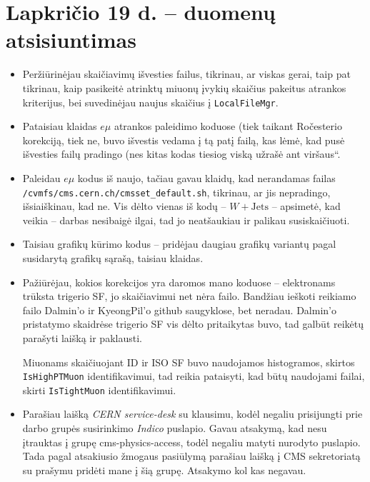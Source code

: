 \documentclass[a4paper, 12pt]{article}
\newcommand{\WJets}{W\! +\!\mathrm{Jets}}
\newcommand{\emu}{e\mu}
\newcommand{\ltq}[1]{{\quotedblbase{}#1\textquotedblleft{}}}
\newcommand{\ttt}[1]{\texttt{#1}}
\begin{document}
\section{Lapkričio 19 d. -- duomenų atsisiuntimas}
\begin{itemize}
	\item Peržiūrinėjau skaičiavimų išvesties failus, tikrinau, ar viskas gerai, taip pat tikrinau,
	kaip pasikeitė atrinktų miuonų įvykių skaičius pakeitus atrankos kriterijus, bei suvedinėjau
	naujus skaičius į \ttt{LocalFileMgr}.
	\item Pataisiau klaidas $\emu$ atrankos paleidimo koduose (tiek taikant Ročesterio korekciją, tiek ne,
	buvo išvestis vedama į tą patį failą, kas lėmė, kad pusė išvesties failų pradingo (nes kitas kodas
	tiesiog viską \ltq{užrašė ant viršaus}.
	\item Paleidau $\emu$ kodus iš naujo, tačiau gavau klaidų, kad nerandamas failas
	\ttt{/cvmfs/cms.cern.ch/cmsset\_default.sh}, tikrinau, ar jis nepradingo, išsiaiškinau, kad ne.
	Vis dėlto vienas iš kodų -- $\WJets$ -- apsimetė, kad veikia -- darbas nesibaigė ilgai, tad jo
	neatšaukiau ir palikau susiskaičiuoti.
	\item Taisiau grafikų kūrimo kodus -- pridėjau daugiau grafikų variantų pagal susidarytą grafikų
	sąrašą, taisiau klaidas.
	\item Pažiūrėjau, kokios korekcijos yra daromos mano koduose -- elektronams trūksta trigerio SF,
	jo skaičiavimui net nėra failo. Bandžiau ieškoti reikiamo failo Dalmin'o ir KyeongPil'o github
	saugyklose, bet neradau. Dalmin'o pristatymo skaidrėse trigerio SF vis dėlto pritaikytas buvo,
	tad galbūt reikėtų parašyti laišką ir paklausti.
	
	Miuonams skaičiuojant ID ir ISO SF buvo naudojamos histogramos, skirtos \ttt{IsHighPTMuon}
	identifikavimui, tad reikia pataisyti, kad būtų naudojami failai, skirti \ttt{IsTightMuon}
	identifikavimui.
	\item Parašiau laišką \textit{CERN service-desk} su klausimu, kodėl negaliu prisijungti prie
	darbo grupės susirinkimo \textit{Indico} puslapio. Gavau atsakymą, kad nesu įtrauktas į grupę
	cms-physics-access, todėl negaliu matyti nurodyto puslapio. Tada pagal atsakiusio žmogaus pasiūlymą
	parašiau laišką į CMS sekretoriatą su prašymu pridėti mane į šią grupę. Atsakymo kol kas negavau.
\end{itemize}
\end{document}
